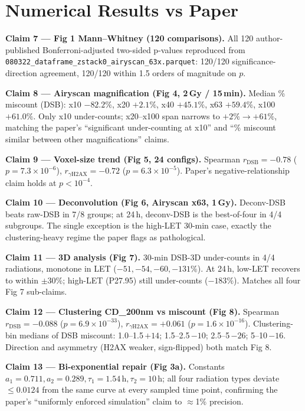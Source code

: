 \documentclass[11pt]{article}
\begin{document}
\section{Numerical Results vs Paper}

\textbf{Claim 7 --- Fig 1 Mann--Whitney (120 comparisons).} All 120 author-published
Bonferroni-adjusted two-sided p-values reproduced from
\texttt{080322\_dataframe\_zstack0\_airyscan\_63x.parquet}: 120/120 significance-
direction agreement, 120/120 within 1.5 orders of magnitude on $p$.

\textbf{Claim 8 --- Airyscan magnification (Fig 4, 2\,Gy / 15\,min).} Median \%
miscount (DSB): x10 $-82.2\%$, x20 $+2.1\%$, x40 $+45.1\%$, x63 $+59.4\%$, x100
$+61.0\%$. Only x10 under-counts; x20--x100 span narrows to $+2\%\to+61\%$, matching
the paper's ``significant under-counting at x10'' and ``\% miscount similar
between other magnifications'' claims.

\textbf{Claim 9 --- Voxel-size trend (Fig 5, 24 configs).} Spearman
$r_{\text{DSB}} = -0.78$ ($p=7.3\times10^{-6}$), $r_{\gamma\text{H2AX}} = -0.72$
($p=6.3\times10^{-5}$). Paper's negative-relationship claim holds at
$p<10^{-4}$.

\textbf{Claim 10 --- Deconvolution (Fig 6, Airyscan x63, 1\,Gy).} Deconv-DSB beats
raw-DSB in 7/8 groups; at 24\,h, deconv-DSB is the best-of-four in 4/4 subgroups.
The single exception is the high-LET 30-min case, exactly the clustering-heavy
regime the paper flags as pathological.

\textbf{Claim 11 --- 3D analysis (Fig 7).} 30-min DSB-3D under-counts in 4/4
radiations, monotone in LET ($-51,-54,-60,-131\%$). At 24\,h, low-LET recovers
to within $\pm30\%$; high-LET (P27.95) still under-counts ($-183\%$). Matches all
four Fig 7 sub-claims.

\textbf{Claim 12 --- Clustering CD\_200nm vs miscount (Fig 8).} Spearman
$r_{\text{DSB}}=-0.088$ ($p=6.9\times10^{-33}$),
$r_{\gamma\text{H2AX}}=+0.061$ ($p=1.6\times10^{-16}$). Clustering-bin medians of
DSB miscount: 1.0--1.5\,$+14$; 1.5--2.5\,$-10$; 2.5--5\,$-26$; 5--10\,$-16$.
Direction and asymmetry (H2AX weaker, sign-flipped) both match Fig 8.

\textbf{Claim 13 --- Bi-exponential repair (Fig 3a).} Constants
$a_1=0.711, a_2=0.289, \tau_1=1.54\,\text{h}, \tau_2=10\,\text{h}$; all four
radiation types deviate $\leq 0.0124$ from the same curve at every sampled
time point, confirming the paper's ``uniformly enforced simulation'' claim
to $\approx$1\% precision.
\end{document}

